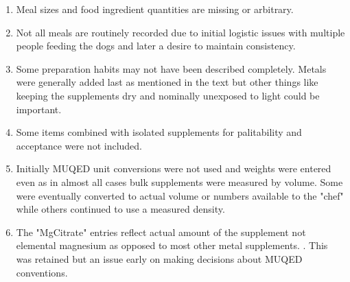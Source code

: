  \ifdefined\mjmstandalone%
%
\else%
\newcommand{\mjmstandalone}[1]{%
  \ifdefined\MJMTEXFRAG%
   #1%
  \fi%
}
  \fi%


\begin{table}[H] \centering
\begin{enumerate}
\item{ Meal sizes and food ingredient  quantities are missing or arbitrary. }
\item{ Not all meals are routinely recorded due to initial logistic issues with multiple people feeding the dogs and later a desire to maintain consistency.  }
\item{ Some preparation habits may not have been described completely. Metals were generally added last as mentioned in the text but other things like keeping the supplements dry and nominally unexposed to light could be important. }
\item{ Some items combined with isolated supplements for palitability and acceptance were not included.  }
\item{  Initially MUQED unit conversions were not used and weights were entered even as in almost all cases bulk supplements were measured by volume. Some were eventually converted to actual volume or numbers available to the "chef" while others continued to use a measured density.   }  
\item{ The "MgCitrate" entries reflect actual amount of the supplement not elemental magnesium as opposed to most other metal supplements. . This was retained but an issue early on making decisions about MUQED conventions. } 
\end{enumerate}
\caption{Known caveats with the MUQED diet data. Most of these limitations should not effect interpretations given here but due to interactions and complexity of copper all details may matter. Many of these issues can be fixed with better planning and the use of a more complete MUQED system. }
\label{tab:caveats}
\end{table}
